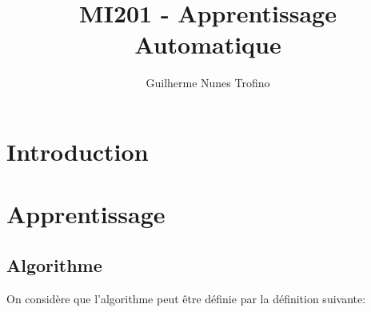 \documentclass{article}
\title{MI201 - Apprentissage Automatique}
\author{Guilherme Nunes Trofino}
\begin{document}
\maketitle
\setlength{\parindent}{0pt}

\newpage\tableofcontents

\section{Introduction}

% 
% 

\section{Apprentissage}
\subsection{Algorithme}
On considère que l'algorithme peut être définie par la définition suivante:
\end{document}
